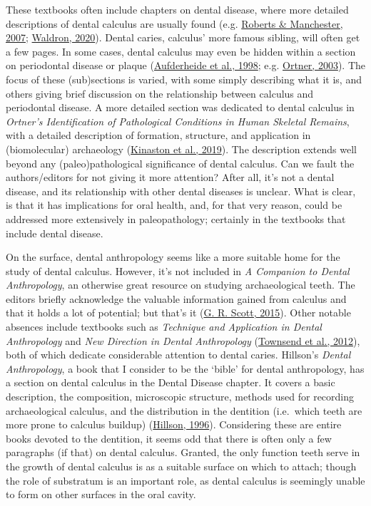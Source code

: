 \documentclass[
  letterpaper,
]{book}
\begin{document}
These textbooks often include chapters on dental disease, where more
detailed descriptions of dental calculus are usually found (e.g.
\protect\hyperlink{ref-robertsDentalDisease2007}{Roberts \& Manchester,
2007}; \protect\hyperlink{ref-waldronPalaeopathology2020}{Waldron,
2020}). Dental caries, calculus' more famous sibling, will often get a
few pages. In some cases, dental calculus may even be hidden within a
section on periodontal disease or plaque
(\protect\hyperlink{ref-aufderheidePaleopathology1998}{Aufderheide et
al., 1998}; e.g.
\protect\hyperlink{ref-ortnerIdentificationPathological2003}{Ortner,
2003}). The focus of these (sub)sections is varied, with some simply
describing what it is, and others giving brief discussion on the
relationship between calculus and periodontal disease. A more detailed
section was dedicated to dental calculus in \emph{Ortner's
Identification of Pathological Conditions in Human Skeletal Remains},
with a detailed description of formation, structure, and application in
(biomolecular) archaeology
(\protect\hyperlink{ref-kinastonOrtnerDentition2019}{Kinaston et al.,
2019}). The description extends well beyond any (paleo)pathological
significance of dental calculus. Can we fault the authors/editors for
not giving it more attention? After all, it's not a dental disease, and
its relationship with other dental diseases is unclear. What is clear,
is that it has implications for oral health, and, for that very reason,
could be addressed more extensively in paleopathology; certainly in the
textbooks that include dental disease.

On the surface, dental anthropology seems like a more suitable home for
the study of dental calculus. However, it's not included in \emph{A
Companion to Dental Anthropology}, an otherwise great resource on
studying archaeological teeth. The editors briefly acknowledge the
valuable information gained from calculus and that it holds a lot of
potential; but that's it
(\protect\hyperlink{ref-scottBriefHistory2015}{G. R. Scott, 2015}).
Other notable absences include textbooks such as \emph{Technique and
Application in Dental Anthropology} and \emph{New Direction in Dental
Anthropology}
(\protect\hyperlink{ref-townsendDentalAnthropology2012}{Townsend et al.,
2012}), both of which dedicate considerable attention to dental caries.
Hillson's \emph{Dental Anthropology}, a book that I consider to be the
`bible' for dental anthropology, has a section on dental calculus in the
Dental Disease chapter. It covers a basic description, the composition,
microscopic structure, methods used for recording archaeological
calculus, and the distribution in the dentition (i.e.~which teeth are
more prone to calculus buildup)
(\protect\hyperlink{ref-hillsonDentalAnthropology1996}{Hillson, 1996}).
Considering these are entire books devoted to the dentition, it seems
odd that there is often only a few paragraphs (if that) on dental
calculus. Granted, the only function teeth serve in the growth of dental
calculus is as a suitable surface on which to attach; though the role of
substratum is an important role, as dental calculus is seemingly unable
to form on other surfaces in the oral cavity.
\end{document}
